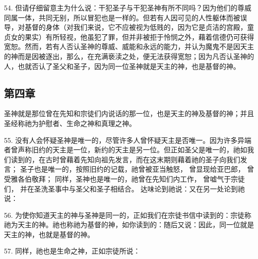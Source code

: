 54. 但请仔细留意主为什么说：干犯圣子与干犯圣神有所不同吗？因为他们的尊威同属一体，共同无别，所以冒犯也是一样的。但若有人因可见的人性躯体而被误导，对基督的身体（对我们来说，它不应被视为低贱的，因为它是贞洁的宫殿，童贞女的果实）有所轻视，他虽犯了罪，但并非被拒于怜悯之外，藉着信德仍可获得宽恕。然而，若有人否认圣神的尊威、威能和永远的能力，并认为魔鬼不是因天主的神而是因被逐出，那么，在充满亵渎之处，便无法获得宽恕；因为凡否认圣神的人，也就否认了圣父和圣子，因为同一位圣神就是天主的神，也是基督的神。\par


\subsection{第四章}

圣神就是那位曾在先知和宗徒们内说话的那一位，也是天主的神及基督的神；并且圣经称祂为护慰者、生命之神和真理之神。\par

55. 没有人会怀疑圣神是唯一的，尽管许多人曾怀疑天主是否唯一。因为许多异端者曾声称旧约的天主是一位，新约的天主是另一位。但正如圣父是唯一的，祂如我们读到的，在古时曾藉着先知向祖先发言，而在这末期则藉着祂的圣子向我们发言； 圣子也是唯一的，按照旧约的记载，祂曾被亚当触怒， 曾显现给亚巴郎， 曾受雅各伯敬拜； 同样，圣神也是唯一的，祂曾在先知们内工作， 曾嘘气于宗徒们， 并在圣洗圣事中与圣父和圣子相结合。 达味论到祂说：又在另一处论到祂说：\par

56. 为使你知道天主的神与圣神是同一的，正如我们在宗徒书信中读到的：宗徒称祂为天主的神。祂也称祂为基督的神，如你读到的：随后又说：因此，同一位就是天主的神，也就是基督的神。\par

57. 同样，祂也是生命之神，正如宗徒所说：\par

